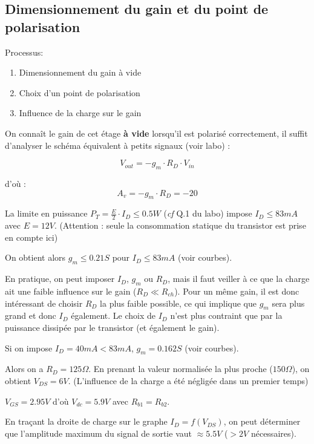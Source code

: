 \documentclass[11pt,a4paper]{article}
\theoremstyle{definition}%
\begin{document}
{\subsection{Dimensionnement du gain et du point de polarisation}
Processus:
\begin{enumerate}
\item Dimensionnement du gain à vide
\item Choix d'un point de polarisation
\item Influence de la charge sur le gain
\end{enumerate}

On connaît le gain de cet étage\textbf{ à vide }lorsqu'il est polarisé correctement, il suffit d'analyser le schéma équivalent à petits signaux (voir labo) :

$$V_{out}=-g_m\cdot  R_D \cdot V_{in}$$

d'où : $$A_v=-g_m\cdot  R_D =-20$$


La limite en puissance $P_T=\frac{E}{2}\cdot I_D\leq0.5W$ (\textit{cf} Q.1 du labo) impose $I_D\leq 83mA$ avec $E=12V$. (Attention : seule la consommation statique du transistor est prise en compte ici)

On obtient alors $g_m\leq0.21S$ pour $I_D\leq83mA$ (voir courbes).

En pratique, on peut imposer $I_D$, $g_m$ ou $R_D$, mais il faut veiller à ce que la charge ait une faible influence sur le gain ($R_{D}\ll R_{ch}$). Pour un même gain, il est donc intéressant de choisir $R_D$ la plus faible possible, ce qui implique que $g_m$ sera plus grand et donc $I_D$ également. Le choix de $I_D$ n'est plus contraint que par la puissance dissipée par le transistor (et également le gain).

Si on impose $I_D=40mA<83mA$, $g_m=0.162S$ (voir courbes).

Alors on a $R_D=125\Omega$. En prenant la valeur normalisée la plus proche ($150\Omega$), on obtient $V_{DS}=6V$. %
(L'influence de la charge a été négligée dans un premier temps)

$V_{GS}=2.95V$ d'où $V_{dc}=5.9V$ avec $R_{b1}=R_{b2}$.

En traçant la droite de charge sur le graphe $I_D=f\left(V_{DS}\right)$, on peut déterminer que l'amplitude maximum du signal de sortie vaut $\approx 5.5V$ ($>2V$ nécessaires).

}
\end{document}
